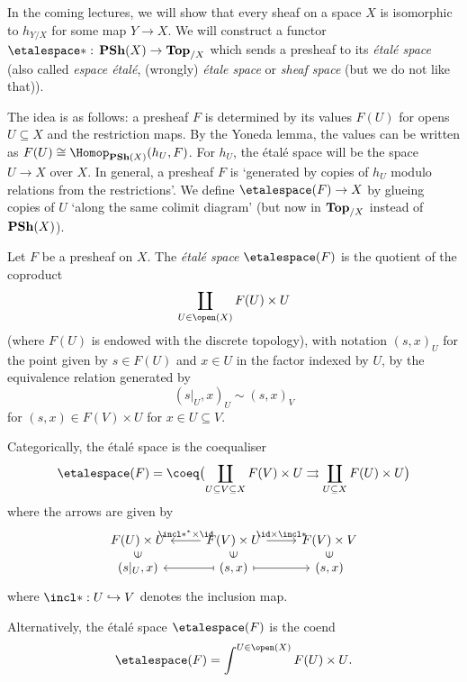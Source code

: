 In the coming lectures, we will show that every sheaf on a space $X$ is isomorphic to $h_{Y/X}$ for some map $Y\to X$.
We will construct a functor $\etalespace*\colon\catPresheaf(X)\to\catTopologicalSpace_{/X}$ which sends a presheaf to its \emph{étalé space} (also called \emph{espace étalé}, (wrongly) \emph{étale space} or \emph{sheaf space} (but we do not like that)).

The idea is as follows: a presheaf $F$ is determined by its values $F(U)$ for opens $U\subseteq X$ and the restriction maps.
By the Yoneda lemma, the values can be written as $F(U)\cong\Hom[\catPresheaf(X)](h_U,F)$.
For $h_U$, the étalé space will be the space $U\to X$ over $X$.
In general, a presheaf $F$ is `generated by copies of $h_U$ modulo relations from the restrictions'.
We define $\etalespace(F)\to X$ by glueing copies of $U$ `along the same colimit diagram' (but now in $\mathbf{Top}_{/X}$ instead of $\operatorname{\mathbf{PSh}}(X)$).

\begin{defn}\label{defn:espace-étalé}
Let $F$ be a presheaf on $X$.
The \emph{étalé space} $\etalespace(F)$ is the quotient of the coproduct
\[ \coprod_{U\in\open(X)} F(U)\times U \]
(where $F(U)$ is endowed with the discrete topology), with notation $(s,x)_U$ for the point given by $s\in F(U)$ and $x\in U$ in the factor indexed by $U$, by the equivalence relation generated by
\[ (s|_U, x)_U \sim (s, x)_V \]
for $(s,x)\in F(V)\times U$ for $x\in U\subseteq V$.
\end{defn}

Categorically, the étalé space is the coequaliser
\[ \etalespace(F) = \coeq\bigl(\coprod_{U\subseteq V\subseteq X} F(V)\times U \rightrightarrows \coprod_{U\subseteq X} F(U)\times U\bigr)\]
where the arrows are given by
\begin{equation*}
    \begin{tikzcd}[row sep=tiny]
        F(U)\times U & F(V)\times U \ar[l, "\incl*^*\times\id"'] \ar[r, "\id\times \incl*"] & F(V)\times V \\
        (s|_U, x) \ar[u, "\in", phantom, marking] & (s,x) \ar[l, mapsto] \ar[r, mapsto] \ar[u, "\in", phantom, marking] & (s,x) \ar[u, "\in", phantom, marking]
    \end{tikzcd}
\end{equation*}
where $\incl*\colon U\hookrightarrow V$ denotes the inclusion map.

Alternatively, the étalé space $\etalespace(F)$ is the coend
\[ \etalespace(F) = \int^{U\in\open(X)} F(U)\times U\text{.} \]

